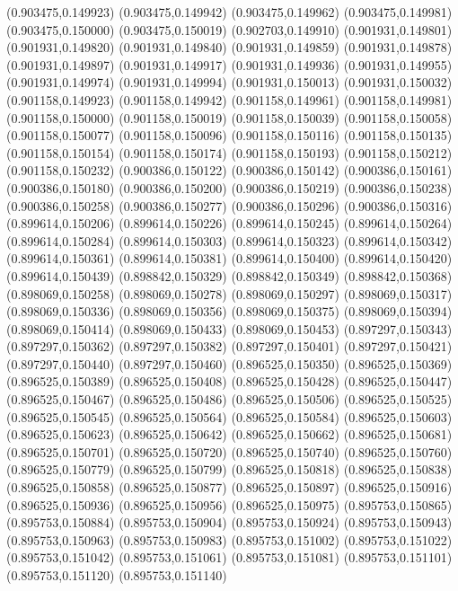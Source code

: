 (0.903475,0.149923)
(0.903475,0.149942)
(0.903475,0.149962)
(0.903475,0.149981)
(0.903475,0.150000)
(0.903475,0.150019)
(0.902703,0.149910)
(0.901931,0.149801)
(0.901931,0.149820)
(0.901931,0.149840)
(0.901931,0.149859)
(0.901931,0.149878)
(0.901931,0.149897)
(0.901931,0.149917)
(0.901931,0.149936)
(0.901931,0.149955)
(0.901931,0.149974)
(0.901931,0.149994)
(0.901931,0.150013)
(0.901931,0.150032)
(0.901158,0.149923)
(0.901158,0.149942)
(0.901158,0.149961)
(0.901158,0.149981)
(0.901158,0.150000)
(0.901158,0.150019)
(0.901158,0.150039)
(0.901158,0.150058)
(0.901158,0.150077)
(0.901158,0.150096)
(0.901158,0.150116)
(0.901158,0.150135)
(0.901158,0.150154)
(0.901158,0.150174)
(0.901158,0.150193)
(0.901158,0.150212)
(0.901158,0.150232)
(0.900386,0.150122)
(0.900386,0.150142)
(0.900386,0.150161)
(0.900386,0.150180)
(0.900386,0.150200)
(0.900386,0.150219)
(0.900386,0.150238)
(0.900386,0.150258)
(0.900386,0.150277)
(0.900386,0.150296)
(0.900386,0.150316)
(0.899614,0.150206)
(0.899614,0.150226)
(0.899614,0.150245)
(0.899614,0.150264)
(0.899614,0.150284)
(0.899614,0.150303)
(0.899614,0.150323)
(0.899614,0.150342)
(0.899614,0.150361)
(0.899614,0.150381)
(0.899614,0.150400)
(0.899614,0.150420)
(0.899614,0.150439)
(0.898842,0.150329)
(0.898842,0.150349)
(0.898842,0.150368)
(0.898069,0.150258)
(0.898069,0.150278)
(0.898069,0.150297)
(0.898069,0.150317)
(0.898069,0.150336)
(0.898069,0.150356)
(0.898069,0.150375)
(0.898069,0.150394)
(0.898069,0.150414)
(0.898069,0.150433)
(0.898069,0.150453)
(0.897297,0.150343)
(0.897297,0.150362)
(0.897297,0.150382)
(0.897297,0.150401)
(0.897297,0.150421)
(0.897297,0.150440)
(0.897297,0.150460)
(0.896525,0.150350)
(0.896525,0.150369)
(0.896525,0.150389)
(0.896525,0.150408)
(0.896525,0.150428)
(0.896525,0.150447)
(0.896525,0.150467)
(0.896525,0.150486)
(0.896525,0.150506)
(0.896525,0.150525)
(0.896525,0.150545)
(0.896525,0.150564)
(0.896525,0.150584)
(0.896525,0.150603)
(0.896525,0.150623)
(0.896525,0.150642)
(0.896525,0.150662)
(0.896525,0.150681)
(0.896525,0.150701)
(0.896525,0.150720)
(0.896525,0.150740)
(0.896525,0.150760)
(0.896525,0.150779)
(0.896525,0.150799)
(0.896525,0.150818)
(0.896525,0.150838)
(0.896525,0.150858)
(0.896525,0.150877)
(0.896525,0.150897)
(0.896525,0.150916)
(0.896525,0.150936)
(0.896525,0.150956)
(0.896525,0.150975)
(0.895753,0.150865)
(0.895753,0.150884)
(0.895753,0.150904)
(0.895753,0.150924)
(0.895753,0.150943)
(0.895753,0.150963)
(0.895753,0.150983)
(0.895753,0.151002)
(0.895753,0.151022)
(0.895753,0.151042)
(0.895753,0.151061)
(0.895753,0.151081)
(0.895753,0.151101)
(0.895753,0.151120)
(0.895753,0.151140)
